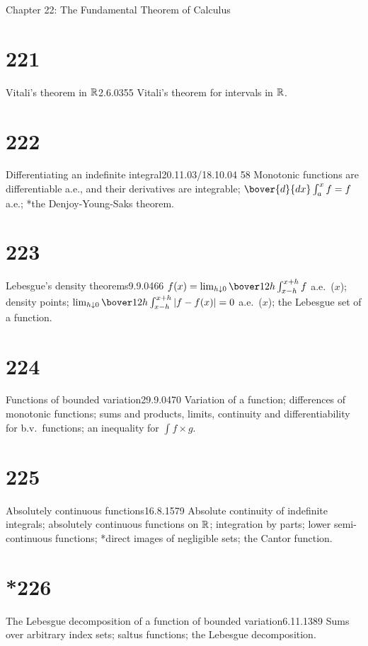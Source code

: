 
Chapter 22:  The Fundamental Theorem of Calculus


\section{221}{Vitali's theorem in $\Bbb{R}$}{2.6.03}{55}{}
{Vitali's theorem for intervals in $\Bbb{R}$.}

\section{222}{Differentiating an indefinite integral}{20.11.03/18.10.04}
{58}{}
{Monotonic functions are differentiable a.e., and their
derivatives are integrable;  $\bover{d}{dx}\int_a^xf=f$ a.e.;
*the Denjoy-Young-Saks theorem.}

\section{223}{Lebesgue's density theorems}{9.9.04}{66}{}
{$f(x)=\lim_{h{\downarrow}0}\bover1{2h}\int_{x-h}^{x+h}f$ a.e.\ ($x$);
density points;
$\lim_{h{\downarrow}0}\bover1{2h}\int_{x-h}^{x+h}|f-f(x)|=0$ a.e.\ ($x$);
the Lebesgue set of a function.}

\section{224}{Functions of bounded variation}{29.9.04}{70}{}
{Variation of a function;  differences of monotonic functions;
sums and products, limits, continuity and differentiability for b.v.\
functions;  an inequality for ${\int}f{\times}g$.}

\section{225}{Absolutely continuous functions}{16.8.15}{79}{}
{Absolute continuity of indefinite integrals;  absolutely
continuous functions on $\Bbb{R}$;  integration by parts;  lower
semi-continuous functions;  *direct images of negligible sets;  the
Cantor function.}

\section{*226}{The Lebesgue decomposition of a function of bounded
variation}{6.11.13}{89}{}
{Sums over arbitrary index sets;  saltus functions;  the Lebesgue
decomposition.}

